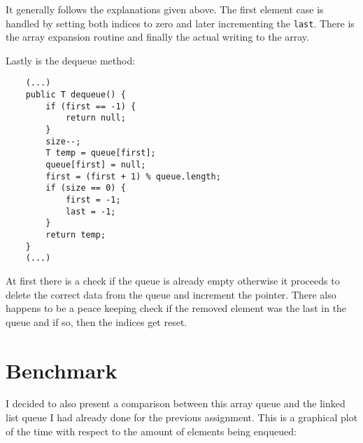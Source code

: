 \documentclass[a4paper,11pt]{article}
\begin{document}
It generally follows the explanations given above. The first element case is handled by setting both indices to zero and later incrementing the {\tt last}. There is the array expansion routine and finally the actual writing to the array.

Lastly is the dequeue method:

\begin{verbatim}
    (...)
    public T dequeue() {
        if (first == -1) {
            return null;
        }
        size--;
        T temp = queue[first];
        queue[first] = null;
        first = (first + 1) % queue.length;
        if (size == 0) {
            first = -1;
            last = -1;
        }
        return temp;
    }
    (...)
\end{verbatim}

At first there is a check if the queue is already empty otherwise it proceeds to delete the correct data from the queue and increment the pointer. There also happens to be a peace keeping check if the removed element was the last in the queue and if so, then the indices get reset.

\section*{Benchmark}

I decided to also present a comparison between this array queue and the linked list queue I had already done for the previous assignment. This is a graphical plot of the time with respect to the amount of elements being enqueued:
\end{document}
